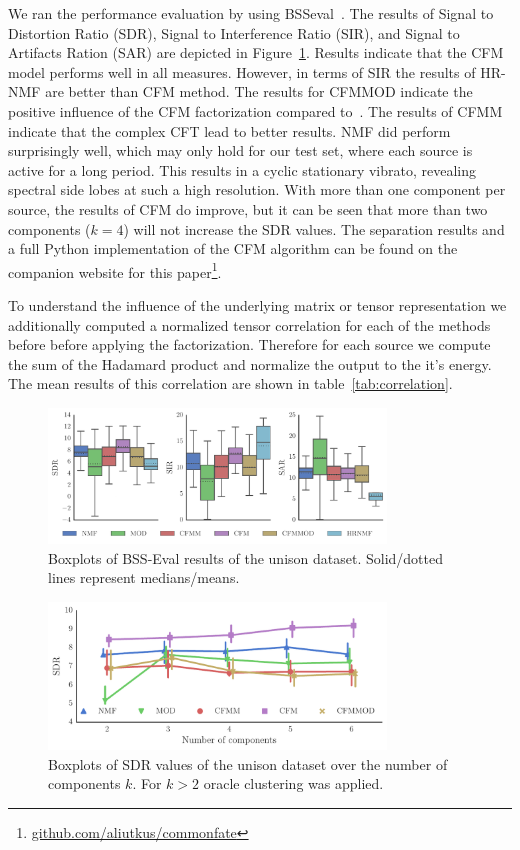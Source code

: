 We ran the performance evaluation by using BSSeval~\cite{vincent06}. The results of Signal to Distortion
Ratio (SDR), Signal to Interference Ratio (SIR), and Signal to Artifacts Ration (SAR) are depicted in Figure~\ref{fig:boxplot_overall}. Results indicate that the CFM model performs well in all measures. However, in terms of SIR the results of HR-NMF are better than CFM method. The results for CFMMOD indicate the positive influence of the CFM factorization compared to~\cite{barker13}.
The results of CFMM indicate that the complex CFT lead to better results. NMF did perform surprisingly well, which may only hold for our test set, where each source is active for a long period. This results in a cyclic stationary vibrato, revealing spectral side lobes at such a high resolution. With more than one component per source, the results of CFM do improve, but it can be seen that more than two components ($k=4$) will not increase the SDR values. The separation results and a full Python implementation of the CFM algorithm can be found on the companion website for this paper\footnote{\url{github.com/aliutkus/commonfate}}.

To understand the influence of the underlying matrix or tensor representation we additionally computed a normalized tensor correlation for each of the methods before before applying the factorization. Therefore for each source we compute the sum of the Hadamard product and normalize the output to the it's energy. The mean results of this correlation are shown in table~\ref{tab:correlation}.

\begin{figure}[ht!]
\centering
		\includegraphics[width=0.8\textwidth]{Chapters/06_Separation_Unknown/figures/cfm_boxplot.pdf}
\caption{Boxplots of BSS-Eval results of the unison dataset. Solid/dotted lines represent medians/means.}
\label{fig:boxplot_overall}
\end{figure}

\begin{figure}[ht!]
\centering
		\includegraphics[width=0.8\textwidth]{Chapters/06_Separation_Unknown/figures/iterations.pdf}
\caption{Boxplots of SDR values of the unison dataset over the number of components $k$. For $k>2$ oracle clustering was applied.}
\label{fig:iterations}
\end{figure}

